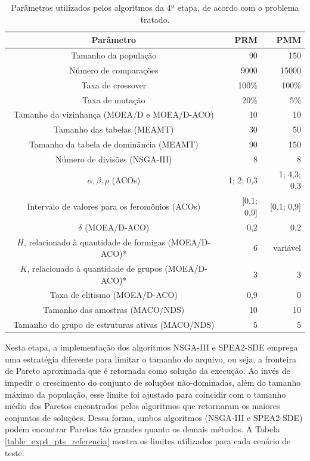 \begin{table}[!htbp]
	\caption{Parâmetros utilizados pelos algoritmos da 4ª etapa, de acordo com o problema tratado.}
	\label{table_exp4_params}
	\begin{center}
		\begin{tabular}{c|r|r}
			\textbf{Parâmetro} & \textbf{PRM} &  \textbf{PMM} \\ %
			\hline
			Tamanho da população               &    90 &      150 \\ %
			Número de comparações        &   9000 &      15000 \\ %
			Taxa de crossover                & 100\% &    100\% \\ %
			Taxa de mutação                 &  20\% &      5\% \\ %
			Tamanho da vizinhança (MOEA/D e MOEA/D-ACO)    &    10 &       10 \\ %
			Tamanho das tabelas (MEAMT)   &    30 &       50 \\ %
			Tamanho da tabela de dominância (MEAMT) &    90 &      150 \\ %
			Número de divisões (NSGA-III)&     8 &        8 \\ %
			$\alpha, \beta, \rho$ (ACOs)& 1; 2; 0,3 & 1; 4,3; 0,3 \\ %
			Intervalo de valores para os feromônios (ACOs)& [0,1; 0,9] & [0,1; 0,9] \\ %
			$\delta$ (MOEA/D-ACO)& 0,2 & 0,2 \\ %
			$H$, relacionado à quantidade de formigas (MOEA/D-ACO)*& 6 & variável \\ %
			$K$, relacionado à quantidade de grupos (MOEA/D-ACO)*& 3 & 3 \\ %
			Taxa de elitismo (MOEA/D-ACO)& 0,9 & 0 \\ %
			Tamanho das amostras (MACO/NDS)& 10 & 10 \\  %
			Tamanho do grupo de estruturas ativas (MACO/NDS)& 5 & 5 \\
			\hline
		\end{tabular}
	\end{center}
\end{table}

Nesta etapa, a implementação dos algoritmos NSGA-III e SPEA2-SDE emprega uma estratégia diferente para limitar o tamanho do arquivo, ou seja, a fronteira de Pareto aproximada que é retornada como solução da execução. Ao invés de impedir o crescimento do conjunto de soluções não-dominadas, além do tamanho máximo da população, esse limite foi ajustado para coincidir com o tamanho médio dos Paretos encontrados pelos algoritmos que retornaram os maiores conjuntos de soluções. Dessa forma, ambos algoritmos (NSGA-III e SPEA2-SDE) podem encontrar Paretos tão grandes quanto os demais métodos. A Tabela \ref{table_exp4_pts_referencia} mostra os limites utilizados para cada cenário de teste.

